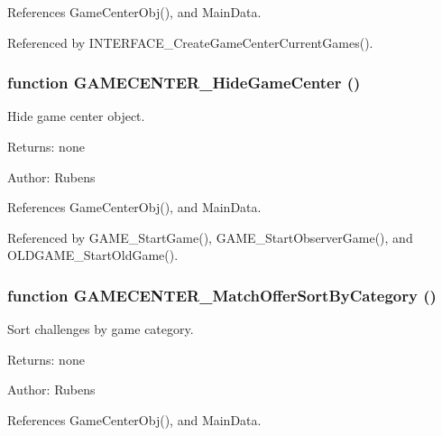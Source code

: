 References GameCenterObj(), and MainData.

Referenced by INTERFACE\_\-CreateGameCenterCurrentGames().
\subsubsection[GAMECENTER\_\-HideGameCenter]{\setlength{\rightskip}{0pt plus 5cm}function GAMECENTER\_\-HideGameCenter ()}\label{gamecenter_2gamecenter_8js_a5fbecfb9008fe0d5aadfc305e6e4d50}


Hide game center object. 

\begin{Desc}
\item[Returns:]none \end{Desc}
\begin{Desc}
\item[Author:]Rubens \end{Desc}


References GameCenterObj(), and MainData.

Referenced by GAME\_\-StartGame(), GAME\_\-StartObserverGame(), and OLDGAME\_\-StartOldGame().
\subsubsection[GAMECENTER\_\-MatchOfferSortByCategory]{\setlength{\rightskip}{0pt plus 5cm}function GAMECENTER\_\-MatchOfferSortByCategory ()}\label{gamecenter_2gamecenter_8js_3354060cf3eee18ab14c40b9bdae8651}


Sort challenges by game category. 

\begin{Desc}
\item[Returns:]none \end{Desc}
\begin{Desc}
\item[Author:]Rubens \end{Desc}


References GameCenterObj(), and MainData.

